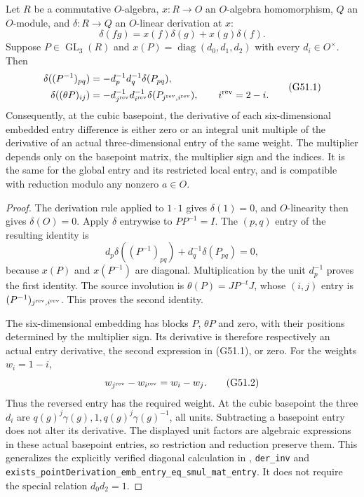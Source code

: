 \begin{lemma}
\label{AC-G51-diagonal}
Let $R$ be a commutative $O$-algebra, $x:R\to O$ an
$O$-algebra homomorphism, $Q$ an $O$-module, and
$\delta:R\to Q$ an $O$-linear derivation at $x$:
\[
 \delta(fg)=x(f)\delta(g)+x(g)\delta(f).
\]
Suppose $P\in\operatorname{GL}_3(R)$ and
$x(P)=\operatorname{diag}(d_0,d_1,d_2)$ with every
$d_i\in O^\times$.  Then
\[
 \begin{split}
 \delta((P^{-1})_{pq})
       &=-d_p^{-1}d_q^{-1}\delta(P_{pq}),\\
 \delta((\theta P)_{ij})
       &=-d_{j^{\rm rev}}^{-1}d_{i^{\rm rev}}^{-1}
                       \delta(P_{j^{\rm rev},i^{\rm rev}}),
       \qquad i^{\rm rev}=2-i .
 \end{split}                                                   \tag{G51.1}
\]
Consequently, at the cubic basepoint, the derivative of
each six-dimensional embedded entry difference is either
zero or an integral unit multiple of the derivative of
an actual three-dimensional entry of the same weight.
The multiplier depends only on the basepoint matrix,
the multiplier sign and the indices.  It is the same
for the global entry and its restricted local entry,
and is compatible with reduction modulo any nonzero
$a\in O$.
\end{lemma}
\begin{proof}
The derivation rule applied to $1\cdot1$ gives
$\delta(1)=0$, and $O$-linearity then gives
$\delta(O)=0$.  Apply $\delta$ entrywise to
$PP^{-1}=I$.  The $(p,q)$ entry of the resulting
identity is
\[
       d_p\delta((P^{-1})_{pq})
                    +d_q^{-1}\delta(P_{pq})=0,
\]
because $x(P)$ and $x(P^{-1})$ are diagonal.
Multiplication by the unit $d_p^{-1}$ proves the first
identity.  The source involution is
$\theta(P)=JP^{-t}J$, whose $(i,j)$ entry is
$(P^{-1})_{j^{\rm rev},i^{\rm rev}}$.  This proves the
second identity.

The six-dimensional embedding has blocks $P$, $\theta P$
and zero, with their positions determined by the multiplier
sign.  Its derivative is therefore respectively an actual
entry derivative, the second expression in (G51.1), or zero.
For the weights $w_i=1-i$,
\[
             w_{j^{\rm rev}}-w_{i^{\rm rev}}=w_i-w_j.
                                                               \tag{G51.2}
\]
Thus the reversed entry has the required weight.
At the cubic basepoint the three $d_i$ are
$q(g)^j\gamma(g),1,q(g)^j\gamma(g)^{-1}$, all units.
Subtracting a basepoint entry does not alter its derivative.
The displayed unit factors are algebraic expressions in
these actual basepoint entries, so restriction and reduction
preserve them.  This generalizes the explicitly verified
diagonal calculation in
,
\texttt{der\_inv} and
\texttt{exists\_pointDerivation\_emb\_entry\_eq\_smul\_mat\_entry}.
It does not require the special relation $d_0d_2=1$.
\end{proof}


